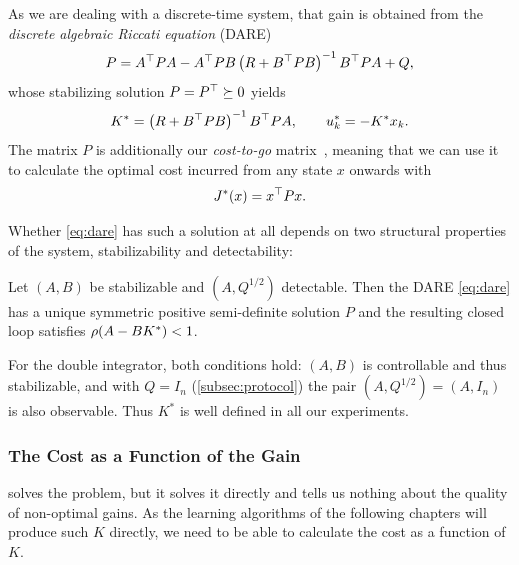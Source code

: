 As we are dealing with a discrete-time system, that gain is obtained from the
\emph{discrete algebraic Riccati equation} (DARE)~\cite[Sec.~4, Eq.~(4.2)]{Recht2019Tour}
\begin{equation}
    \label{eq:dare}
    P = A^{\top} P A - A^{\top} P B \left( R + B^{\top} P B \right)^{-1} B^{\top} P A + Q ,
\end{equation}
whose stabilizing solution $P = P^{\top} \succeq 0$ yields~\cite[Sec.~4]{Recht2019Tour}
\begin{equation}
    \label{eq:optimal-gain}
    K^{*} = \left( R + B^{\top} P B \right)^{-1} B^{\top} P A ,
    \qquad
    u_k^{*} = -K^{*} x_k .
\end{equation}
The matrix $P$ is additionally our
\emph{cost-to-go} matrix~\cite[Sec.~1, Eq.~(1)]{Fazel2018Global}, meaning that we can use it to calculate the optimal cost 
incurred from any state $x$ onwards with
\begin{equation}
    \label{eq:cost-to-go}
    J^{*}(x) = x^{\top} P x .
\end{equation}

Whether \eqref{eq:dare} has such a solution at all depends on two structural
properties of the system, stabilizability and
detectability:

\begin{theorem}
\label{thm:dare-existence}
Let $(A, B)$ be stabilizable and $(A, Q^{1/2})$ detectable. Then the DARE
\eqref{eq:dare} has a unique symmetric positive semi-definite solution $P$
and the resulting closed loop satisfies $\operatorname{\rho}(A - B K^{*}) < 1$.
\end{theorem}

For the double integrator, both conditions hold: $(A, B)$ is controllable and thus
stabilizable, and with $Q = I_n$ (\cref{subsec:protocol}) the pair $(A, Q^{1/2}) = (A, I_n)$
is also observable. Thus $K^{*}$ is well defined in all our experiments.

\subsubsection{The Cost as a Function of the Gain}
\label{subsubsec:lqr-cost-of-gain}

 solves the problem, but it solves it directly and
tells us nothing about the quality of non-optimal gains. As the learning 
algorithms of the following chapters will produce such $K$ directly, 
we need to be able to calculate the cost as a function of $K$.

